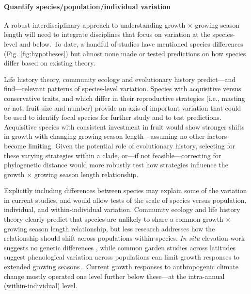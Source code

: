 \documentclass[11pt]{article}
\begin{document}
\paragraph{Quantify species/population/individual variation} 

A robust interdisciplinary approach to understanding growth $\times$ growing season length will need to integrate disciplines that focus on variation at the species-level and below. To date, a handful of studies have mentioned species differences (Fig. \ref{fig:hypotheses}) but almost none made or tested predictions on how species differ based on existing theory. 

Life history theory, community ecology and evolutionary history predict---and find---relevant patterns of species-level variation. Species with acquisitive versus conservative traits, and which differ in their reproductive strategies (i.e., masting or not, fruit size and number) provide an axis of important variation that could be used to identify focal species for further study and to test predictions. Acquisitive species with consistent investment in fruit would show stronger shifts in growth with changing growing season length---assuming no other factors become limiting. Given the potential role of evolutionary history, selecting for these varying strategies within a clade, or---if not feasible---correcting for phylogenetic distance would more robustly test how strategies influence the growth $\times$ growing season length relationship. %

Explicitly including differences between species may explain some of the variation in current studies, and would allow tests of the scale of species versus population, individual, and within-individual variation. Community ecology and life history theory clearly predict that species are unlikely to share a common growth $\times$ growing season length relationship, but less research addresses how the relationship should shift across populations within species. \emph{In situ} elevation work suggests no genetic differences \citep{king2013tree}, while common garden studies across latitudes suggest phenological variation across populations can limit growth responses to extended growing seasons \citep{soolanayakanahally2013timing}. Current growth responses to anthropogenic climate change mostly operated one level further below these---at the intra-annual (within-individual) level. 
\end{document}
